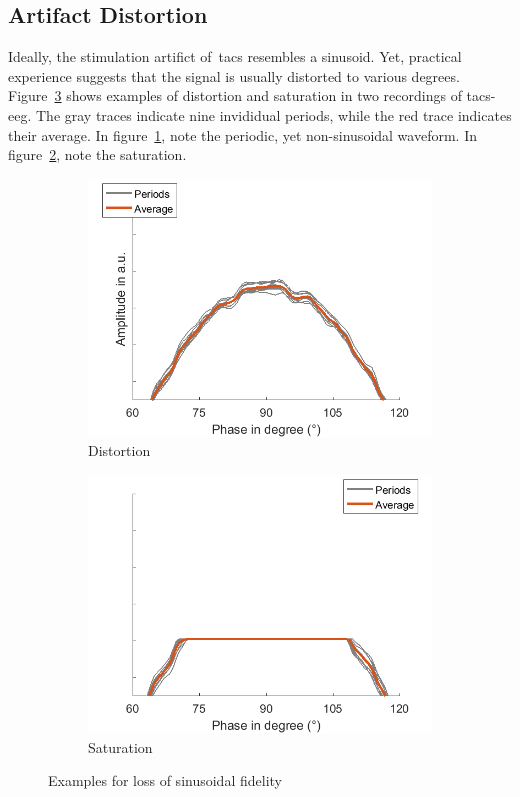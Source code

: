 \documentclass[a4paper]{article}
\begin{document}
\subsection{Artifact Distortion}

Ideally, the stimulation artifict of~\gls{tacs} resembles a sinusoid. Yet, practical experience suggests that the signal is usually distorted to various degrees.
Figure~\ref{fig:nonsinus} shows examples of distortion and saturation in two recordings of \gls{tacs}-\gls{eeg}. The gray traces indicate nine invididual periods, while the red trace indicates their average. In figure~\ref{fig:distortion}, note the periodic, yet non-sinusoidal waveform. In figure~\ref{fig:saturation}, note the saturation.

\begin{figure}[hbtp]
    \begin{subfigure}{.5\textwidth}
    \includegraphics[width=\textwidth]{./img/intro/distortion.png}
    \caption{Distortion}\label{fig:distortion}
    \end{subfigure}
    \begin{subfigure}{.5\textwidth}
    \includegraphics[width=\textwidth]{./img/intro/saturation.png}
    \caption{Saturation}\label{fig:saturation}
    \end{subfigure}
    \caption{Examples for loss of sinusoidal fidelity}\label{fig:nonsinus}
\end{figure}
\end{document}

